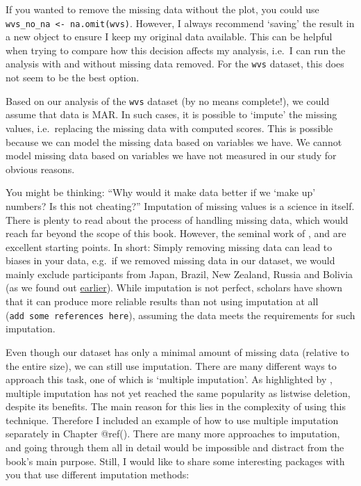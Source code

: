 \documentclass[
]{book}
\begin{document}
If you wanted to remove the missing data without the plot, you could use \texttt{wvs\_no\_na\ \textless{}-\ na.omit(wvs)}. However, I always recommend `saving' the result in a new object to ensure I keep my original data available. This can be helpful when trying to compare how this decision affects my analysis, i.e.~I can run the analysis with and without missing data removed. For the \texttt{wvs} dataset, this does not seem to be the best option.

Based on our analysis of the \texttt{wvs} dataset (by no means complete!), we could assume that data is MAR. In such cases, it is possible to `impute' the missing values, i.e.~replacing the missing data with computed scores. This is possible because we can model the missing data based on variables we have. We cannot model missing data based on variables we have not measured in our study for obvious reasons.

You might be thinking: ``Why would it make data better if we `make up' numbers? Is this not cheating?'' Imputation of missing values is a science in itself. There is plenty to read about the process of handling missing data, which would reach far beyond the scope of this book. However, the seminal work of \citet{van-buuren-2018}, \citet{dong-et-al-2013} and \citet{jakobsen-et-al-2017} are excellent starting points. In short: Simply removing missing data can lead to biases in your data, e.g.~if we removed missing data in our dataset, we would mainly exclude participants from Japan, Brazil, New Zealand, Russia and Bolivia (as we found out \protect\hyperlink{missing-data-by-country-table}{earlier}). While imputation is not perfect, scholars have shown that it can produce more reliable results than not using imputation at all (\texttt{add\ some\ references\ here}), assuming the data meets the requirements for such imputation.

Even though our dataset has only a minimal amount of missing data (relative to the entire size), we can still use imputation. There are many different ways to approach this task, one of which is `multiple imputation'. As highlighted by \citet{van2020rebutting}, multiple imputation has not yet reached the same popularity as listwise deletion, despite its benefits. The main reason for this lies in the complexity of using this technique. Therefore I included an example of how to use multiple imputation separately in Chapter @ref(). There are many more approaches to imputation, and going through them all in detail would be impossible and distract from the book's main purpose. Still, I would like to share some interesting packages with you that use different imputation methods:
\end{document}
